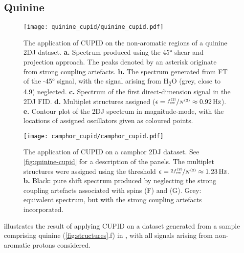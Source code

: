 \subsection{Quinine}
\begin{figure}
    \centering
    \texttt{[image: quinine\_cupid/quinine\_cupid.pdf]}
    \caption[
        The application of \acs{CUPID} on a quinine \acs{2DJ} dataset.
    ]{
        The application of \ac{CUPID} on the non-aromatic regions of a quinine
        \ac{2DJ} dataset.
        \textbf{a.} Spectrum produced using the \ang{45} shear and projection
        approach. The peaks denoted by an asterisk originate from strong
        coupling artefacts.
        \textbf{b.} The spectrum generated from \ac{FT} of the \ang{-45}
        signal, with the signal arising from H\textsubscript{2}O (grey, close
        to \qty{4.9}{\partspermillion}) neglected.
        \textbf{c.} Spectrum of the first direct-dimension signal in the
        \ac{2DJ} \ac{FID}.
        \textbf{d.} Multiplet structures assigned ($\epsilon =
        \nicefrac{\fswtwo}{\Ntwo} \approx \qty{0.92}{\hertz}$).
        \textbf{e.} Contour plot of the \ac{2DJ} spectrum in magnitude-mode,
        with the locations of assigned oscillators given as coloured points.
    }
    \label{fig:quinine-cupid}
    \vspace{20pt}
    \texttt{[image: camphor\_cupid/camphor\_cupid.pdf]}%
    \caption[
        The application of \acs{CUPID} on a camphor dataset.
    ]{
        The application of \acs{CUPID} on a camphor \ac{2DJ} dataset.
        See \cref{fig:quinine-cupid} for a description of the panels.
        The multiplet structures were assigned using the threshold
        $\epsilon = \nicefrac{2 \fswtwo}{\Ntwo} \approx \qty{1.23}{\hertz}$.
        \textbf{b.} Black: pure shift spectrum produced by neglecting the
        strong coupling artefacts associated with spins (F) and (G).
        Grey: equivalent spectrum, but with the strong coupling artefacts
        incorporated.
    }
    \label{fig:camphor-cupid}%
\end{figure}

 illustrates the result of applying \ac{CUPID} on
a dataset generated from a sample comprising quinine (\cref{fig:structures}.f)
in ,
with all signals arising from non-aromatic protons considered.

